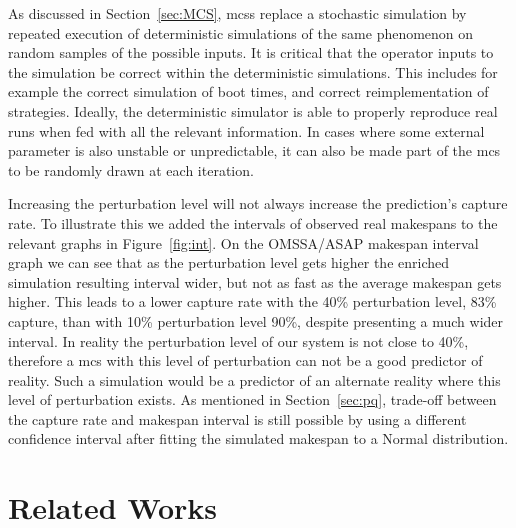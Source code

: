 \documentclass[10pt,conference,compsocconf]{IEEEtran}
\begin{document}
As discussed in Section~\ref{sec:MCS}, \aclp{mcs} replace a stochastic
simulation by repeated execution of deterministic simulations of the same
phenomenon on random samples of the possible inputs. It is critical that the
operator inputs to the simulation be correct within the deterministic simulations.
This includes for example the correct simulation of boot times, and correct
reimplementation of strategies. Ideally, the deterministic simulator is able to
properly reproduce real runs when fed with all the relevant information. In cases
where some external parameter is also unstable or unpredictable, it can also be
made part of the \ac{mcs} to be randomly drawn at each iteration.

Increasing the perturbation level will not always increase the prediction's
capture rate. To illustrate this we added the intervals of observed real
makespans to the relevant graphs in Figure~\ref{fig:int}. On the OMSSA/ASAP
makespan interval graph we can see that as the perturbation level gets higher
the enriched simulation resulting interval wider, but not as fast as the
average makespan gets higher. This leads to a lower capture rate with the 40\%
perturbation level, 83\% capture, than with 10\% perturbation level 90\%,
despite presenting a much wider interval. In reality the perturbation level of
our system is not close to 40\%, therefore a \ac{mcs} with this level of
perturbation can not be a good predictor of reality. Such a simulation would be
a predictor of an alternate reality where this level of perturbation exists. As
mentioned in Section~\ref{sec:pq}, trade-off between the capture rate and
makespan interval is still possible by using a different confidence
interval after fitting the simulated makespan to a Normal distribution.



\section{Related Works}

\end{document}
